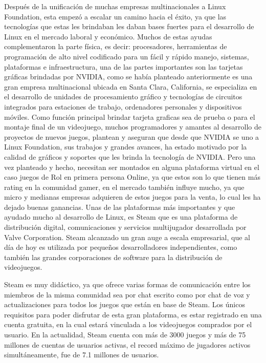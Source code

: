 Después de la unificación de muchas empresas multinacionales
a Linux Foundation, esta empezó a escalar un camino hacia el
éxito, ya que las tecnologías que estas les brindaban les daban
bases fuertes para el desarrollo de Linux en el mercado laboral y
económico. Muchos de estas ayudas complementaron la parte
física, es decir: procesadores, herramientas de programación de
alto nivel codificado para un fácil y rápido manejo, sistemas,
plataformas e infraestructura, una de las partes importantes son
las tarjetas gráficas brindadas por NVIDIA, como se había
planteado anteriormente es una gran empresa multinacional
ubicada en Santa Clara, California, se especializa en el
desarrollo de unidades de procesamiento gráfico y tecnologías
de circuitos integrados para estaciones de trabajo, ordenadores
personales y dispositivos móviles. Como función principal
brindar tarjeta graficas sea de prueba o para el montaje final de
un videojuego, muchos programadores y amantes al desarrollo
de proyectos de nuevos juegos, plantean y aseguran que desde
que NVIDIA se uno a Linux Foundation, sus trabajos y grandes
avances, ha estado motivado por la calidad de gráficos y
soportes que les brinda la tecnología de NVIDIA. Pero una vez
planteado y hecho, necesitan ser montados en alguna plataforma
virtual en el caso juegos de Rol en primera persona Online, ya
que estos son lo que tienen más rating en la comunidad gamer,
en el mercado también influye mucho, ya que micro y medianas
empresas adquieren de estos juegos para la venta, lo cual les ha
dejado buenas ganancias. Unas de las plataformas más
importantes y que ayudado mucho al desarrollo de Linux, es
Steam que es una plataforma de distribución digital,
comunicaciones y servicios multijugador desarrollada por Valve
Corporation. Steam alcanzado un gran auge a escala
empresarial, que al día de hoy es utilizada por pequeños
desarrolladores independientes, como también las grandes
corporaciones de software para la distribución de videojuegos.

Steam es muy didáctico, ya que ofrece varias formas de
comunicación entre los miembros de la misma comunidad sea
por chat escrito como por chat de voz y actualizaciones para
todos los juegos que están en base de Steam. Los únicos
requisitos para poder disfrutar de esta gran plataforma, es estar
registrado en una cuenta gratuita, en la cual estará vinculada a
los videojuegos comprados por el usuario. En la actualidad,
Steam cuenta con más de 3000 juegos y más de 75 millones de
cuentas de usuarios activas, el record máximo de jugadores
activos simultáneamente, fue de 7.1 millones de usuarios.

